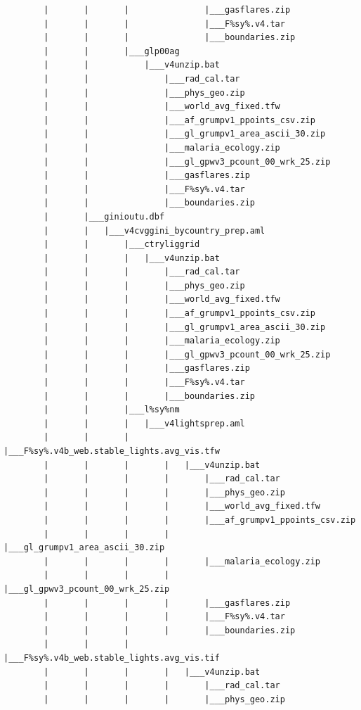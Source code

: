 \documentclass[]{book}
\begin{document}
\begin{verbatim}
        |       |       |               |___gasflares.zip
        |       |       |               |___F%sy%.v4.tar
        |       |       |               |___boundaries.zip
        |       |       |___glp00ag
        |       |           |___v4unzip.bat
        |       |               |___rad_cal.tar
        |       |               |___phys_geo.zip
        |       |               |___world_avg_fixed.tfw
        |       |               |___af_grumpv1_ppoints_csv.zip
        |       |               |___gl_grumpv1_area_ascii_30.zip
        |       |               |___malaria_ecology.zip
        |       |               |___gl_gpwv3_pcount_00_wrk_25.zip
        |       |               |___gasflares.zip
        |       |               |___F%sy%.v4.tar
        |       |               |___boundaries.zip
        |       |___ginioutu.dbf
        |       |   |___v4cvggini_bycountry_prep.aml
        |       |       |___ctryliggrid
        |       |       |   |___v4unzip.bat
        |       |       |       |___rad_cal.tar
        |       |       |       |___phys_geo.zip
        |       |       |       |___world_avg_fixed.tfw
        |       |       |       |___af_grumpv1_ppoints_csv.zip
        |       |       |       |___gl_grumpv1_area_ascii_30.zip
        |       |       |       |___malaria_ecology.zip
        |       |       |       |___gl_gpwv3_pcount_00_wrk_25.zip
        |       |       |       |___gasflares.zip
        |       |       |       |___F%sy%.v4.tar
        |       |       |       |___boundaries.zip
        |       |       |___l%sy%nm
        |       |       |   |___v4lightsprep.aml
        |       |       |       |___F%sy%.v4b_web.stable_lights.avg_vis.tfw
        |       |       |       |   |___v4unzip.bat
        |       |       |       |       |___rad_cal.tar
        |       |       |       |       |___phys_geo.zip
        |       |       |       |       |___world_avg_fixed.tfw
        |       |       |       |       |___af_grumpv1_ppoints_csv.zip
        |       |       |       |       |___gl_grumpv1_area_ascii_30.zip
        |       |       |       |       |___malaria_ecology.zip
        |       |       |       |       |___gl_gpwv3_pcount_00_wrk_25.zip
        |       |       |       |       |___gasflares.zip
        |       |       |       |       |___F%sy%.v4.tar
        |       |       |       |       |___boundaries.zip
        |       |       |       |___F%sy%.v4b_web.stable_lights.avg_vis.tif
        |       |       |       |   |___v4unzip.bat
        |       |       |       |       |___rad_cal.tar
        |       |       |       |       |___phys_geo.zip

\end{verbatim}
\end{document}
